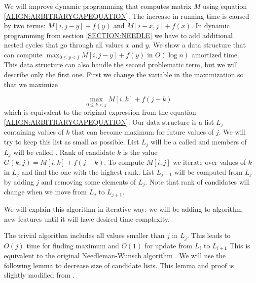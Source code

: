 We will improve dynamic programming that computes matrix $M$ using equation
\ref{ALIGN:ARBITRARYGAPEQUATION}. The increase in running time is caused by two
terms: $M[i,j-y]+f(y)$ and
$M[i-x,j]+f(x)$. In dynamic programming from section \ref{SECTION:NEEDLE} we  have
to add additional nested cycles that go through all values $x$ and $y$. We show
a data
structure that can compute $\max_{0\leq y < j}M[i,j-y]+f(y)$ in $O(\log n)$
amortized time.
This data structure can also handle the second problematic term, but we
will describe only the first one. First we change the variable in the
maximization so that we maximize

\begin{equation}
\max_{0\leq k < j}M[i,k]+f(j-k)\label{CONVEX:MAXFUNCTION}
\end{equation}
which is equivalent to the original expression from the equation
\ref{ALIGN:ARBITRARYGAPEQUATION}.  Our data structure is a list $L_j$ containing
values of 
$k$ that can become maximum for future values of $j$. We will try to keep this list as small as
possible. List $L_j$ will be a called  and members of $L_j$
will be called . Rank of candidate $k$ is the value
$G(k,j)=M[i,k]+f(j-k)$. To compute $M[i,j]$ we iterate over values of $k$ in
$L_j$ and find the one with the highest rank.
List $L_{j+1}$ will be computed from $L_j$ by adding $j$ and
removing some elements of $L_j$. 
Note that rank of
candidates will change when we move from $L_j$ to $L_{j+1}$.

We will explain this algorithm in iterative way: we will be adding to algorithm
new features until it will have desired time complexity. 

The trivial algorithm includes all values smaller than $j$ in $L_j$.
This leads to $O(j)$ time for finding maximum and $O(1)$ for update
from $L_i$ to $L_{i+1}$
This is equivalent to the original Needleman-Wunsch algorithm
\cite{Needleman1970}. 
We will use the following lemma to
decrease size of candidate lists. This lemma and proof is  slightly modified
from 
\cite{GusfieldBook}.



